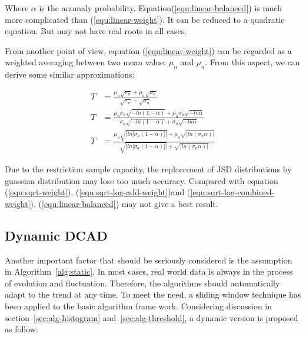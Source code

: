 \documentclass[a4paper]{IEEEtran}
\begin{document}
			Where $\alpha$ is the anomaly probability. Equation(\ref{equ:linear-balanced}) is much more complicated than (\ref{equ:linear-weight}). It can be reduced to a quadratic equation. But may not have real roots in all cases.
			
			From another point of view, equation (\ref{equ:linear-weight}) can be regarded as a weighted averaging between two mean value: $\mu_n$ and $\mu_a$. From this aspect, we can derive some similar approximations:
			
			\begin{align}
				T &= \frac{\mu_n \sqrt{\sigma_a} + \mu_a \sqrt{\sigma_n}}{\sqrt{\sigma_a} + \sqrt{\sigma_n}}
				\label{equ:sqrt-weight}\\
				T &= \frac{\mu_n \sigma_a \sqrt{-ln(1 - \alpha)}
					+ \mu_a \sigma_n \sqrt{-ln\alpha}}
				{\sigma_a \sqrt{-ln(1 - \alpha)} + \sigma_n \sqrt{-ln\alpha}}
				\label{equ:sqrt-log-add-weight}\\
				T &= \frac{\mu_n \sqrt{|ln\big[\sigma_a (1 - \alpha)\big]|}
					+ \mu_a \sqrt{|ln(\sigma_n \alpha)|}}
				{\sqrt{|ln\big[\sigma_a (1 - \alpha)\big]|} + \sqrt{|ln(\sigma_n \alpha)|}}
				\label{equ:sqrt-log-combined-weight}
			\end{align}
			
			Due to the restriction sample capacity, the replacement of JSD distributions by guassian distribution may lose too much accuracy. Compared with equation (\ref{equ:sqrt-weight}), (\ref{equ:sqrt-log-add-weight})and (\ref{equ:sqrt-log-combined-weight}), (\ref{equ:linear-balanced}) may not give a best result.
		
		\subsection{Dynamic DCAD}
			Another important factor that should be seriously considered is the assumption in Algorithm~\ref{alg:static}. In most cases, real world data is always in the process of evolution and fluctuation. Therefore, the algorithms should automatically adapt to the trend at any time. To meet the need, a sliding window technique has been applied to the basic algorithm frame work. Considering discussion in section~\ref{sec:alg-histogram} and~\ref{sec:alg-threshold}, a dynamic version is proposed as follow:
			
\end{document}
